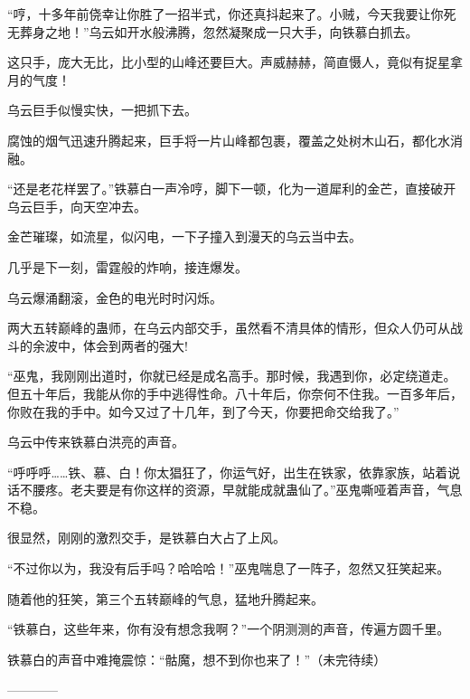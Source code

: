 \begin{this_body}
“哼，十多年前侥幸让你胜了一招半式，你还真抖起来了。小贼，今天我要让你死无葬身之地！”乌云如开水般沸腾，忽然凝聚成一只大手，向铁慕白抓去。

这只手，庞大无比，比小型的山峰还要巨大。声威赫赫，简直慑人，竟似有捉星拿月的气度！

乌云巨手似慢实快，一把抓下去。

腐蚀的烟气迅速升腾起来，巨手将一片山峰都包裹，覆盖之处树木山石，都化水消融。

“还是老花样罢了。”铁慕白一声冷哼，脚下一顿，化为一道犀利的金芒，直接破开乌云巨手，向天空冲去。

金芒璀璨，如流星，似闪电，一下子撞入到漫天的乌云当中去。

几乎是下一刻，雷霆般的炸响，接连爆发。

乌云爆涌翻滚，金色的电光时时闪烁。

两大五转巅峰的蛊师，在乌云内部交手，虽然看不清具体的情形，但众人仍可从战斗的余波中，体会到两者的强大!

“巫鬼，我刚刚出道时，你就已经是成名高手。那时候，我遇到你，必定绕道走。但五十年后，我能从你的手中逃得性命。八十年后，你奈何不住我。一百多年后，你败在我的手中。如今又过了十几年，到了今天，你要把命交给我了。”

乌云中传来铁慕白洪亮的声音。

“呼呼呼……铁、慕、白！你太猖狂了，你运气好，出生在铁家，依靠家族，站着说话不腰疼。老夫要是有你这样的资源，早就能成就蛊仙了。”巫鬼嘶哑着声音，气息不稳。

很显然，刚刚的激烈交手，是铁慕白大占了上风。

“不过你以为，我没有后手吗？哈哈哈！”巫鬼喘息了一阵子，忽然又狂笑起来。

随着他的狂笑，第三个五转巅峰的气息，猛地升腾起来。

“铁慕白，这些年来，你有没有想念我啊？”一个阴测测的声音，传遍方圆千里。

铁慕白的声音中难掩震惊：“骷魔，想不到你也来了！”（未完待续）

------------

\end{this_body}

